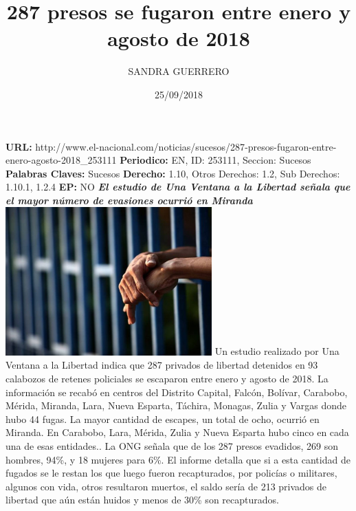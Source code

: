 \documentclass{article}%
\title{\textbf{287 presos se fugaron entre enero y agosto de 2018}}%
\author{SANDRA GUERRERO}%
\date{25/09/2018}%
\begin{document}
%
\normalsize%
\maketitle%
\textbf{URL: }%
http://www.el{-}nacional.com/noticias/sucesos/287{-}presos{-}fugaron{-}entre{-}enero{-}agosto{-}2018\_253111\newline%
%
\textbf{Periodico: }%
EN, %
ID: %
253111, %
Seccion: %
Sucesos\newline%
%
\textbf{Palabras Claves: }%
Sucesos\newline%
%
\textbf{Derecho: }%
1.10, %
Otros Derechos: %
1.2, %
Sub Derechos: %
1.10.1, 1.2.4\newline%
%
\textbf{EP: }%
NO\newline%
\newline%
%
\textbf{\textit{El estudio de Una Ventana a la Libertad señala que el mayor número de evasiones ocurrió en Miranda}}%
\newline%
\newline%
%
\includegraphics[width=300px]{116.jpg}%
\newline%
%
Un estudio realizado por Una Ventana a la Libertad indica que 287 privados de libertad detenidos en 93 calabozos de retenes policiales se escaparon entre enero y agosto de 2018.%
\newline%
%
La información se recabó en centros del Distrito Capital, Falcón, Bolívar, Carabobo, Mérida, Miranda, Lara, Nueva Esparta, Táchira, Monagas, Zulia y Vargas donde hubo 44 fugas.%
\newline%
%
La mayor cantidad de escapes, un total de ocho, ocurrió en Miranda. En Carabobo, Lara, Mérida, Zulia y Nueva Esparta hubo cinco en cada una de esas entidades..%
\newline%
%
La ONG señala que de los 287 presos evadidos, 269 son hombres, 94\%, y 18 mujeres para 6\%.%
\newline%
%
El informe detalla que si a esta cantidad de fugados se le restan los que luego fueron recapturados, por policías o militares, algunos con vida, otros resultaron muertos, el saldo sería de 213 privados de libertad que aún están huidos y menos de 30\% son recapturados.%
\end{document}
